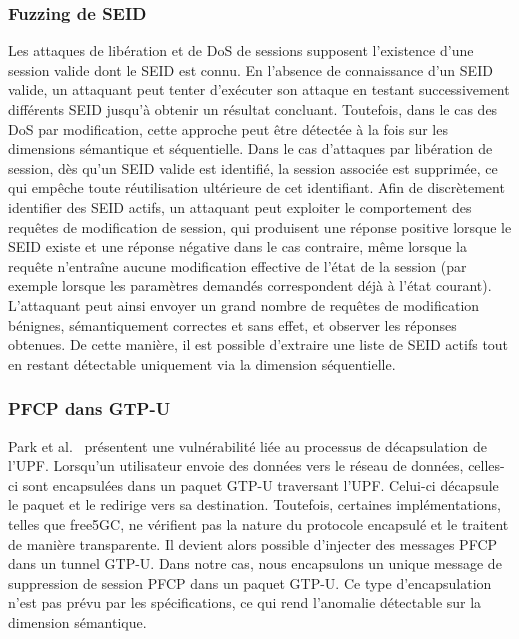\documentclass[a4paper,11pt,twoside]{StyleThese}
\begin{document}
\subsubsection{Fuzzing de SEID}
Les attaques de libération et de DoS de sessions supposent l’existence d’une session valide dont le SEID est connu. En l’absence de connaissance d’un SEID valide, un attaquant peut tenter d’exécuter son attaque en testant successivement différents SEID jusqu’à obtenir un résultat concluant. Toutefois, dans le cas des DoS par modification, cette approche peut être détectée à la fois sur les dimensions sémantique et séquentielle. Dans le cas d’attaques par libération de session, dès qu’un SEID valide est identifié, la session associée est supprimée, ce qui empêche toute réutilisation ultérieure de cet identifiant. Afin de discrètement identifier des SEID actifs, un attaquant peut exploiter le comportement des requêtes de modification de session, qui produisent une réponse positive lorsque le SEID existe et une réponse négative dans le cas contraire, même lorsque la requête n’entraîne aucune modification effective de l’état de la session (par exemple lorsque les paramètres demandés correspondent déjà à l’état courant). L’attaquant peut ainsi envoyer un grand nombre de requêtes de modification bénignes, sémantiquement correctes et sans effet, et observer les réponses obtenues. De cette manière, il est possible d’extraire une liste de SEID actifs tout en restant détectable uniquement via la dimension séquentielle.

\subsubsection{PFCP dans GTP-U}
Park et al.~\cite{pfcp_in_gtp} présentent une vulnérabilité liée au processus de décapsulation de l’UPF. Lorsqu’un utilisateur envoie des données vers le réseau de données, celles-ci sont encapsulées dans un paquet GTP-U traversant l’UPF. Celui-ci décapsule le paquet et le redirige vers sa destination. Toutefois, certaines implémentations, telles que free5GC, ne vérifient pas la nature du protocole encapsulé et le traitent de manière transparente. Il devient alors possible d’injecter des messages PFCP dans un tunnel GTP-U. Dans notre cas, nous encapsulons un unique message de suppression de session PFCP dans un paquet GTP-U. Ce type d'encapsulation n’est pas prévu par les spécifications, ce qui rend l’anomalie détectable sur la dimension sémantique.
\end{document}
